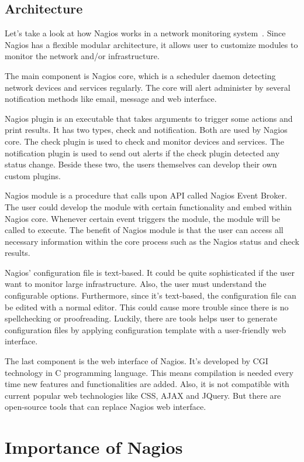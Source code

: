 \documentclass[9pt,twocolumn,twoside]{styles/osajnl}
\begin{document}
\subsection{Architecture}

Let's take a look at how Nagios works in a network monitoring system~\cite{nagios-paper-2012}. Since Nagios has a flexible modular architecture, it allows user to customize modules to monitor the network and/or infrastructure. 

The main component is Nagios core, which is a scheduler daemon detecting network devices and services regularly. The core will alert administer by several notification methods like email, message and web interface. 

Nagios plugin is an executable that takes arguments to trigger some actions and print results. It has two types, check and notification. Both are used by Nagios core. The check plugin is used to check and monitor devices and services. The notification plugin is used to send out alerts if the check plugin detected any status change. Beside these two, the users themselves can develop their own custom plugins. 

Nagios module is a procedure that calls upon API called Nagios Event Broker. The user could develop the module with certain functionality and embed within Nagios core. Whenever certain event triggers the module, the module will be called to execute. The benefit of Nagios module is that the user can access all necessary information within the core process such as the Nagios status and check results. 

Nagios' configuration file is text-based. It could be quite sophisticated if the user want to monitor large infrastructure. Also, the user must understand the configurable options. Furthermore, since it's text-based, the configuration file can be edited with a normal editor. This could cause more trouble since there is no spellchecking or proofreading. Luckily, there are tools helps user to generate configuration files by applying configuration template with a user-friendly web interface.

The last component is the web interface of Nagios. It's developed by CGI technology in C programming language. This means compilation is needed every time new features and functionalities are added. Also, it is not compatible with current popular web technologies like CSS, AJAX and JQuery.  But there are open-source tools that can replace Nagios web interface.

\section{Importance of Nagios}
\end{document}
